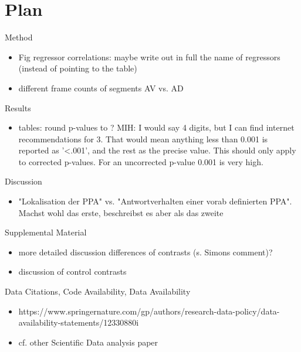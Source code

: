 \documentclass[english]{article}
\begin{document}
\pagebreak[4]


\section*{Plan}

\noindent Method

\begin{itemize}
    \item Fig regressor correlations: maybe write out in full the name of
        regressors (instead of pointing to the table)
    \item different frame counts of segments AV vs. AD
\end{itemize}


\noindent Results

\begin{itemize}
    \item tables: round p-values to ? MIH: I would say 4 digits, but I can find internet
      recommendations for 3. That would mean anything less than 0.001 is reported as '<.001',
      and the rest as the precise value. This should only apply to corrected p-values.
      For an uncorrected p-value 0.001 is very high.
\end{itemize}

\noindent Discussion
\begin{itemize}
    \item "Lokalisation der PPA" vs. "Antwortverhalten einer vorab definierten
        PPA". Machst wohl das erste, beschreibst es aber als das zweite
\end{itemize}


\noindent Supplemental Material
\begin{itemize}
    \item more detailed discussion differences of contrasts (s. Simons comment)?
    \item discussion of control contrasts
\end{itemize}


\noindent Data Citations, Code Availability, Data Availability

\begin{itemize}
    \item https://www.springernature.com/gp/authors/research-data-policy/data-availability-statements/12330880i
    \item cf. other Scientific Data analysis paper
\end{itemize}

\pagebreak[4]
\end{document}
